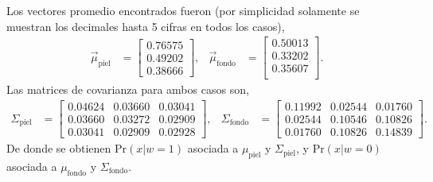 Los vectores promedio encontrados fueron (por simplicidad solamente se muestran los decimales hasta 5 cifras en todos los casos),
\begin{align*}
    \vec{\mu}_{\text{piel}} & =
    \begin{bmatrix}
        0.76575 \\
        0.49202 \\
        0.38666
    \end{bmatrix} , &
    \vec{\mu}_{\text{fondo}} & =
    \begin{bmatrix}
        0.50013 \\
        0.33202 \\
        0.35607 \\
    \end{bmatrix} .
\end{align*}
Las matrices de covarianza para ambos casos son,
\begin{align*}
    \Sigma_{\text{piel}} & = 
    \begin{bmatrix}
        0.04624 & 0.03660 & 0.03041 \\
        0.03660 & 0.03272 & 0.02909 \\
        0.03041 & 0.02909 & 0.02928
    \end{bmatrix} , &
    \Sigma_{\text{fondo}} & = 
    \begin{bmatrix}
        0.11992 & 0.02544 & 0.01760 \\
        0.02544 & 0.10546 & 0.10826 \\
        0.01760 & 0.10826 & 0.14839
    \end{bmatrix} .
\end{align*}
De donde se obtienen $\text{Pr}(x | w = 1)$ asociada a $\mu_{\text{piel}}$ y $\Sigma_{\text{piel}}$, y $\text{Pr}(x | w = 0)$ asociada a $\mu_{\text{fondo}}$ y $\Sigma_{\text{fondo}}$.

